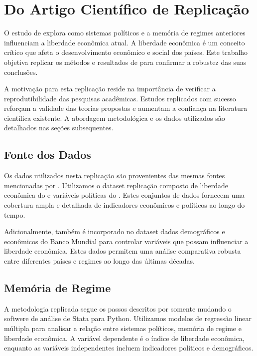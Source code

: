 


\chapter{Do Artigo Científico de Replicação}

O estudo de \cite{https://doi.org/10.1111/coep.12635} explora como sistemas políticos e a memória de regimes anteriores influenciam a liberdade econômica atual. A liberdade econômica é um conceito crítico que afeta o desenvolvimento econômico e social dos países. Este trabalho objetiva replicar os métodos e resultados de \cite{https://doi.org/10.1111/coep.12635} para confirmar a robustez das suas conclusões.

A motivação para esta replicação reside na importância de verificar a reprodutibilidade das pesquisas acadêmicas. Estudos replicados com sucesso reforçam a validade das teorias propostas e aumentam a confiança na literatura científica existente. A abordagem metodológica e os dados utilizados são detalhados nas seções subsequentes.


\section{Fonte dos Dados}
Os dados utilizados nesta replicação são provenientes das mesmas fontes mencionadas por \cite{https://doi.org/10.1111/coep.12635}. Utilizamos o dataset replicação composto de liberdade econômica do \cite{fraser2022} e variáveis políticas do \cite{polity2022}. Estes conjuntos de dados fornecem uma cobertura ampla e detalhada de indicadores econômicos e políticos ao longo do tempo.

Adicionalmente, também é incorporado no dataset dados demográficos e econômicos do Banco Mundial para controlar variáveis que possam influenciar a liberdade econômica. Estes dados permitem uma análise comparativa robusta entre diferentes países e regimes ao longo das últimas décadas.

\section{Memória de Regime}
A metodologia replicada segue os passos descritos por \cite{https://doi.org/10.1111/coep.12635} somente mudando o softwere de análise de Stata para Python. Utilizamos modelos de regressão linear múltipla para analisar a relação entre sistemas políticos, memória de regime e liberdade econômica. A variável dependente é o índice de liberdade econômica, enquanto as variáveis independentes incluem indicadores políticos e demográficos.

